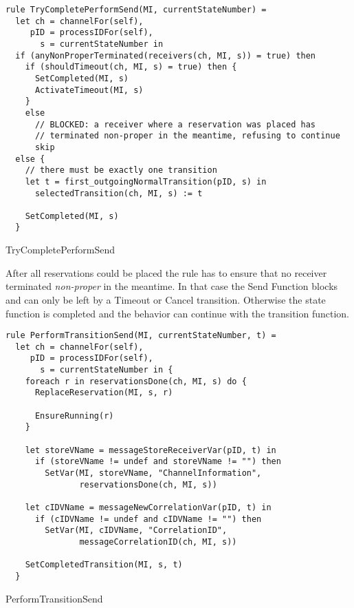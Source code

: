 \begin{listing}[H]
\begin{verbatim}
rule TryCompletePerformSend(MI, currentStateNumber) =
  let ch = channelFor(self),
     pID = processIDFor(self),
       s = currentStateNumber in
  if (anyNonProperTerminated(receivers(ch, MI, s)) = true) then
    if (shouldTimeout(ch, MI, s) = true) then {
      SetCompleted(MI, s)
      ActivateTimeout(MI, s)
    }
    else
      // BLOCKED: a receiver where a reservation was placed has
      // terminated non-proper in the meantime, refusing to continue
      skip
  else {
    // there must be exactly one transition
    let t = first_outgoingNormalTransition(pID, s) in
      selectedTransition(ch, MI, s) := t

    SetCompleted(MI, s)
  }
\end{verbatim}
\caption{TryCompletePerformSend}
\label{lst:shortasm:TryCompletePerformSend}
\end{listing}


After all reservations could be placed the 
rule has to ensure that no receiver terminated \textit{non-proper} in the
meantime. In that case the Send Function blocks and can only be left by a
Timeout or Cancel transition. Otherwise the state function is completed and the behavior can
continue with the transition function.


\begin{listing}[H]
\begin{verbatim}
rule PerformTransitionSend(MI, currentStateNumber, t) =
  let ch = channelFor(self),
     pID = processIDFor(self),
       s = currentStateNumber in {
    foreach r in reservationsDone(ch, MI, s) do {
      ReplaceReservation(MI, s, r)

      EnsureRunning(r)
    }

    let storeVName = messageStoreReceiverVar(pID, t) in
      if (storeVName != undef and storeVName != "") then
        SetVar(MI, storeVName, "ChannelInformation",
               reservationsDone(ch, MI, s))

    let cIDVName = messageNewCorrelationVar(pID, t) in
      if (cIDVName != undef and cIDVName != "") then
        SetVar(MI, cIDVName, "CorrelationID",
               messageCorrelationID(ch, MI, s))

    SetCompletedTransition(MI, s, t)
  }
\end{verbatim}
\caption{PerformTransitionSend}
\label{lst:shortasm:PerformTransitionSend}
\end{listing}


